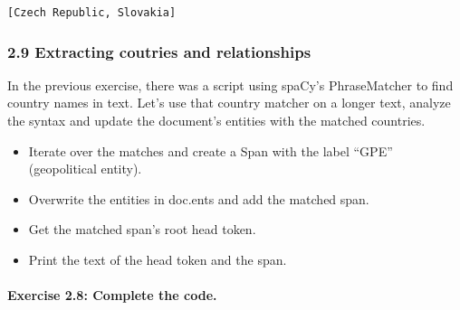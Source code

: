 \documentclass[11pt]{article}
\providecommand{\tightlist}{%
      \setlength{\itemsep}{0pt}\setlength{\parskip}{0pt}}
\begin{document}
    \begin{Verbatim}[commandchars=\\\{\}]
[Czech Republic, Slovakia]

    \end{Verbatim}

    \hypertarget{extracting-coutries-and-relationships}{%
\subsubsection{2.9 Extracting coutries and
relationships}\label{extracting-coutries-and-relationships}}

In the previous exercise, there was a script using spaCy's PhraseMatcher
to find country names in text. Let's use that country matcher on a
longer text, analyze the syntax and update the document's entities with
the matched countries.

\begin{itemize}
\tightlist
\item
  Iterate over the matches and create a Span with the label ``GPE''
  (geopolitical entity).
\item
  Overwrite the entities in doc.ents and add the matched span.
\item
  Get the matched span's root head token.
\item
  Print the text of the head token and the span.
\end{itemize}

\hypertarget{exercise-2.8-complete-the-code.}{%
\paragraph{Exercise 2.8: Complete the
code.}\label{exercise-2.8-complete-the-code.}}
\end{document}
